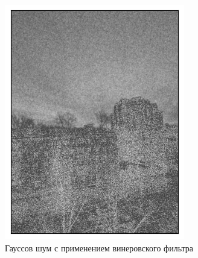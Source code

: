 \documentclass[a4paper,12pt]{article}
\begin{document}
\begin{figure}[H]
    \begin{minipage}{0.49\textwidth}
        \centering \includegraphics[width=\textwidth]{results/nlf_gaus_6.png}
        \caption{Гауссов шум с применением винеровского фильтра}
    \end{minipage}\hfill
    \begin{minipage}{0.49\textwidth}

\end{minipage}
\end{figure}
\end{document}
